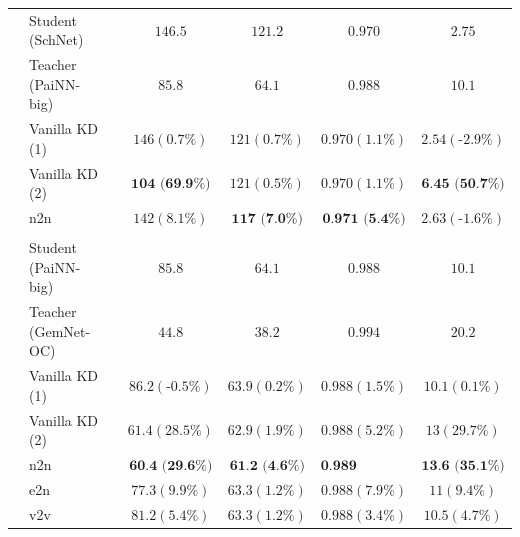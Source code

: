 \documentclass{article}
\begin{document}
\begin{table}[H]
\begin{tabular}{llccccc}
\parbox[t]{2mm}{} & Student (SchNet)                 &   &              $146.5$        &   $121.2$     &   $0.970$      &   $2.75$    \\
& Teacher (PaiNN-big)       &   &            $85.8$        &   $64.1$     &   $0.988$      &   $10.1$    \\
& Vanilla KD (1)            &   &            $146 (0.7\%)$          &         $121 (0.7\%)$     &     $0.970 (1.1\%)$        &  $2.54 (\text{-}2.9\%)$    \\
& Vanilla KD (2)            &   &            $\textbf{104 (69.9\%)}$          &          $121 (0.5\%)$     &     $0.970 (1.1\%)$        &  $\textbf{6.45 (50.7\%)}$    \\
& n2n                       &   &            $142 (8.1\%)$          &          $\textbf{117 (7.0\%)}$     &     $\textbf{0.971 (5.4\%)}$        &  $2.63 (\text{-}1.6\%)$    \\
 \\
\parbox[t]{2mm}{} & Student (PaiNN-big)                     &   &              $85.8$        &   $64.1$     &   $0.988$      &   $10.1$    \\
& Teacher (GemNet-OC)                  &   &              $44.8$        &   $38.2$     &   $0.994$      &   $20.2$    \\
& Vanilla KD (1)          &   &            $86.2 (\text{-}0.5\%)$          &          $63.9 (0.2\%)$     &     $0.988 (1.5\%)$        &  $10.1 (0.1\%)$    \\
& Vanilla KD (2)         &   &            $61.4 (28.5\%)$          &          $62.9 (1.9\%)$     &     $0.988 (5.2\%)$        &  $13 (29.7\%)$    \\
& n2n             &   &            $\textbf{60.4 (29.6\%)}$          &          $\textbf{61.2 (4.6\%)}$     &     $\textbf{0.989 (14.9\%)}$        &  $\textbf{13.6 (35.1\%)}$    \\
& e2n                       &   &            $77.3 (9.9\%)$          &          $63.3 (1.2\%)$     &     $0.988 (7.9\%)$        &  $11 (9.4\%)$    \\
& v2v                  &   &            $81.2 (5.4\%)$          &          $63.3 (1.2\%)$     &     $0.988 (3.4\%)$        &  $10.5 (4.7\%)$    \\   

\end{tabular}
\label{tab:coll_results}
\end{table}
\end{document}
